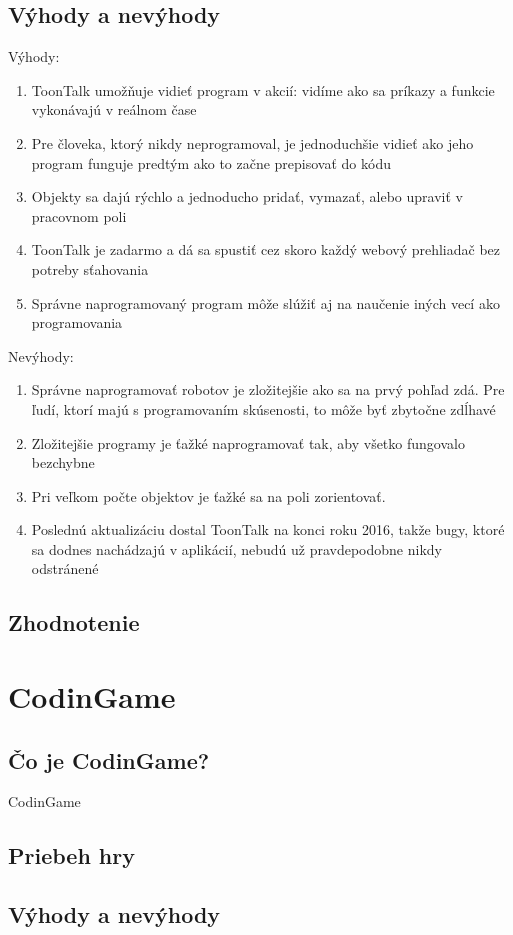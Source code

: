 \documentclass[slovak,a4paper,11pt]{article}
\begin{document}
\subsection{Výhody a nevýhody}
Výhody:
\begin{enumerate}
\item ToonTalk umožňuje vidieť program v akcií: vidíme ako sa príkazy a funkcie vykonávajú v reálnom čase
\item Pre človeka, ktorý nikdy neprogramoval, je jednoduchšie vidieť ako jeho program funguje predtým ako to začne prepisovať do kódu
\item Objekty sa dajú rýchlo a jednoducho pridať, vymazať, alebo upraviť v pracovnom poli 
\item ToonTalk je zadarmo a dá sa spustiť cez skoro každý webový prehliadač bez potreby sťahovania
\item Správne naprogramovaný program môže slúžiť aj na naučenie iných vecí ako programovania
\end{enumerate}
Nevýhody:
\begin{enumerate}
\item Správne naprogramovať robotov je zložitejšie ako sa na prvý pohľad zdá. Pre ľudí, ktorí majú s programovaním skúsenosti, to môže byť zbytočne zdĺhavé
\item Zložitejšie programy je ťažké naprogramovať tak, aby všetko fungovalo bezchybne
\item Pri veľkom počte objektov je ťažké sa na poli zorientovať.
\item Poslednú aktualizáciu dostal ToonTalk na konci roku 2016, takže bugy, ktoré sa dodnes nachádzajú v aplikácií, nebudú už pravdepodobne nikdy odstránené
\end{enumerate}
\subsection{Zhodnotenie}
\section{CodinGame}
\subsection{Čo je CodinGame?}
CodinGame
\subsection{Priebeh hry}
\subsection{Výhody a nevýhody}
\end{document}

